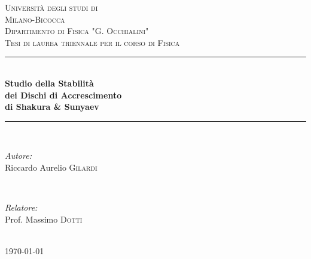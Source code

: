 \documentclass[a4paperbi]{article}
\newcommand{\HRule}{\rule{\linewidth}{0.5mm}} %
\begin{document}
\begin{titlepage}
\center %
\textsc{\LARGE Università degli studi di}\\[0.1cm]
\textsc{\LARGE Milano-Bicocca}\\[1.2cm] %
\textsc{\Large Dipartimento di Fisica "G. Occhialini"}\\[0.5cm] %
\textsc{\large Tesi di laurea triennale per il corso di Fisica}\\[0.5cm] %
\HRule \\[0.4cm]
{ \huge \bfseries Studio della Stabilità}\\[0.1cm]
{ \huge \bfseries dei Dischi di Accrescimento}\\[0.1cm]
{ \huge \bfseries  di Shakura \& Sunyaev}\\[0.4cm] %
\HRule \\[1.5cm]
\begin{minipage}{0.4\textwidth}
\begin{flushleft} \large
\emph{Autore:}\\
Riccardo Aurelio \textsc{Gilardi} %
\end{flushleft}
\end{minipage}
~
\begin{minipage}{0.4\textwidth}
\begin{flushright} \large
\emph{Relatore:} \\
Prof. Massimo \textsc{Dotti} %
\end{flushright}
\end{minipage}\\[2cm]
{\large \today}\\[1cm] %

\end{titlepage}
\end{document}
